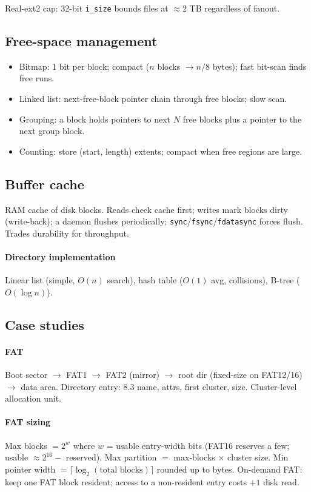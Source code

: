 \textcolor{Bittersweet}{Real-ext2 cap}: 32-bit \texttt{i\_size} bounds files at $\approx 2$ TB regardless of fanout.

\subsection{Free-space management}
\begin{itemize}
  \item \textcolor{Bittersweet}{Bitmap}: 1 bit per block; compact ($n$ blocks $\to n/8$ bytes); fast bit-scan finds free runs.
  \item \textcolor{Bittersweet}{Linked list}: next-free-block pointer chain through free blocks; slow scan.
  \item \textcolor{Bittersweet}{Grouping}: a block holds pointers to next $N$ free blocks plus a pointer to the next group block.
  \item \textcolor{Bittersweet}{Counting}: store (start, length) extents; compact when free regions are large.
\end{itemize}

\subsection{Buffer cache}
RAM cache of disk blocks. Reads check cache first; writes mark blocks dirty (\textcolor{Bittersweet}{write-back}); a daemon flushes periodically; \texttt{sync}/\texttt{fsync}/\texttt{fdatasync} forces flush. Trades durability for throughput.

\paragraph{Directory implementation}
\textcolor{Bittersweet}{Linear list} (simple, $O(n)$ search), \textcolor{Bittersweet}{hash table} ($O(1)$ avg, collisions), \textcolor{Bittersweet}{B-tree} ($O(\log n)$).

\subsection{Case studies}
\paragraph{FAT} Boot sector $\to$ FAT1 $\to$ FAT2 (mirror) $\to$ root dir (fixed-size on FAT12/16) $\to$ data area. Directory entry: 8.3 name, attrs, first cluster, size. Cluster-level allocation unit.
\paragraph{FAT sizing} Max blocks $=2^w$ where $w$ = usable entry-width bits (FAT16 reserves a few; usable $\approx 2^{16}-$ reserved). Max partition $=$ max-blocks $\times$ cluster size. Min pointer width $=\lceil\log_2(\text{total blocks})\rceil$ rounded up to bytes. \textcolor{Bittersweet}{On-demand FAT}: keep one FAT block resident; access to a non-resident entry costs $+1$ disk read.
